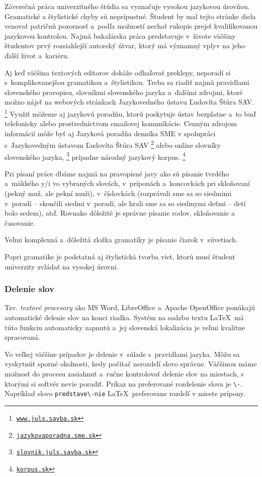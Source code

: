 Záverečná práca univerzitného štúdia sa vyznačuje
vysokou jazykovou úrovňou.
Gramatické a štylistické chyby sú neprípustné.
Študent by mal tejto stránke diela venovať patričnú
pozornosť a~podľa možností nechať rukopis prejsť
kvalifikovanou jazykovou kontrolou.
Najmä bakalárska práca predstavuje v~živote väčšiny študentov
prvý rozsiahlejší autorský útvar,
ktorý má významný vplyv na jeho ďalší život a~kariéru.

Aj keď väčšina textových editorov dokáže odhaľovať preklepy,
neporadí si s~komplikovanejšou gramatikou a~štylistikou.
Treba sa riadiť najmä pravidlami slovenského pravopisu,
slovníkmi slovenského jazyka a~ďalšími zdrojmi,
ktoré možno nájsť na webových stránkach
Jazykovedného ústavu Ľudovíta Štúra SAV.%
\footnote{\href{https://www.juls.savba.sk/}{\tt www.juls.savba.sk}}
Využiť môžeme aj jazykovú poradňu,
ktorú poskytuje ústav bezplatne a~to buď telefonicky alebo
prostredníctvom emailovej komunikácie.
Cenným zdrojom informácií môže byť aj Jazyková poradňa
denníka SME v spolupráci
s~Jazykovedným ústavom Ľudovíta Štúra SAV%
\footnote{\href{https://jazykovaporadna.sme.sk/}{\tt jazykovaporadna.sme.sk}}
alebo online slovníky slovenského jazyka,%
\footnote{\href{https://slovnik.juls.savba.sk/}{\tt slovnik.juls.savba.sk}}
prípadne národný jazykový korpus.%
\footnote{\href{https://korpus.sk/}{\tt korpus.sk}}

Pri písaní práce dbáme najmä na pravopisné javy ako sú písanie
tvrdého a~mäkkého y/i vo vybraných slovách,
v~príponách a~koncovkách pri skloňovaní
(pekný muž, ale pekní muži),
v~číslovkách (rozprávali sme sa so siedmimi v~poradí
-- skončili siedmi v~poradí,
ale hrali sme sa so siedmymi deťmi -- detí bolo sedem), atď.
Rovnako dôležité je správne písanie rodov,
skloňovanie a časovanie.

Veľmi komplexná a~dôležitá zložka gramatiky
je písanie čiarok v~súvetiach.

Popri gramatike je podstatná aj štylistická tvorba viet,
ktorú musí študent univerzity zvládať na vysokej úrovni.

\subsubsection{Delenie slov}
Tzv. \emph{textové procesory} ako MS Word, LibreOffice a~Apache OpenOffice
ponúkajú automatické delenie slov na konci riadka.
Systém na sadzbu textu \LaTeX\ má túto funkciu automaticky zapnutú a~jej slovenská lokalizácia je veľmi kvalitne spracovaná.

Vo veľkej väčšine prípadov je delenie
v~súlade s~pravidlami jazyka.
Môžu sa vyskytnúť sporné okolnosti,
kedy počítač nerozdelí slovo správne.
Väčšinou máme možnosť do procesu zasiahnuť
a~ručne kontrolovať delenie slov na miestach,
s ktorými si softvér nevie poradiť.
Príkaz na preferované rozdelenie slova je \verb|\-|.
Napríklad slovo \verb|predstave\-nie| \LaTeX\
preferovane rozdelí v mieste prípony.

